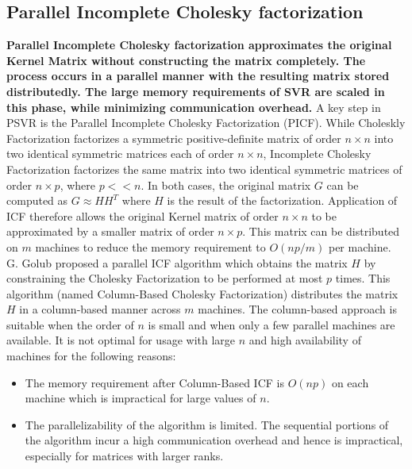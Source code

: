 \documentclass[12pt]{article}
\begin{document}
 \subsection{Parallel Incomplete Cholesky factorization}
 \label{Parallel Incomplete Cholesky factorization}
  {\bf Parallel Incomplete Cholesky factorization approximates the original Kernel Matrix without constructing the matrix completely. The process occurs in a parallel manner with the resulting matrix stored distributedly. The large memory requirements of SVR are scaled in this phase, while minimizing communication overhead.}
  \newline\newline
A key step in PSVR is the Parallel Incomplete Cholesky Factorization (PICF). While Choleskly Factorization factorizes a symmetric positive-definite matrix of order $n \times n$ into two  identical symmetric matrices each of order $n \times n$, Incomplete Cholesky Factorization factorizes the same matrix into two identical symmetric matrices of order $n \times p$, where $p << n$. In both cases, the original matrix $G$ can be computed as $G \approx HH^T$ where $H$ is the result of the factorization.
 \newline
 \newline
Application of ICF therefore allows the original Kernel matrix  of order $n \times n$ to be approximated by a smaller matrix of order  $n \times p$. This matrix can be distributed on $m$ machines to reduce the memory requirement to $O(np/m)$ per machine.
 \newline \newline
 G. Golub proposed a parallel ICF algorithm which obtains the matrix $H$ by constraining the Cholesky Factorization to be performed at most $p$ times. This algorithm (named Column-Based Cholesky Factorization) distributes the matrix $H$ in a column-based manner across $m$ machines. The column-based approach is suitable when the order of $n$ is small and when only a few parallel machines are available. It is not optimal for usage with large $n$ and high availability of machines for the following reasons:
\begin{itemize}
\item The memory requirement after Column-Based ICF is $O(np)$ on each machine which is impractical for large values of $n$.
\item The parallelizability of the algorithm is limited. The sequential portions of the algorithm incur a high communication overhead and hence is impractical, especially for matrices with larger ranks. 
\end{itemize}
\end{document}
